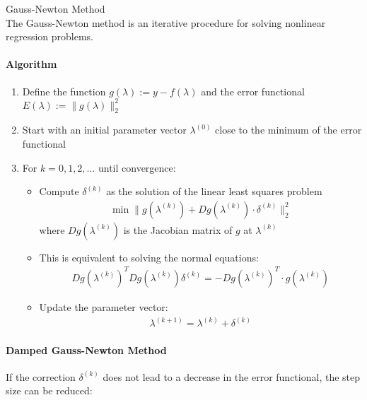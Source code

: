 \begin{KR}{Gauss-Newton Method}\\
The Gauss-Newton method is an iterative procedure for solving nonlinear regression problems.

\paragraph{Algorithm}
\begin{enumerate}
    \item Define the function $g(\lambda) := y - f(\lambda)$ and the error functional $E(\lambda) := \|g(\lambda)\|_2^2$
    \item Start with an initial parameter vector $\lambda^{(0)}$ close to the minimum of the error functional 
    \item For $k = 0, 1, 2, \ldots$ until convergence:
        \begin{itemize}
            \item Compute $\delta^{(k)}$ as the solution of the linear least squares problem
            \begin{align*}
            \min \|g(\lambda^{(k)}) + Dg(\lambda^{(k)}) \cdot \delta^{(k)}\|_2^2
            \end{align*}
            where $Dg(\lambda^{(k)})$ is the Jacobian matrix of $g$ at $\lambda^{(k)}$
            
            \item This is equivalent to solving the normal equations:
            \begin{align*}
            Dg(\lambda^{(k)})^T Dg(\lambda^{(k)})\delta^{(k)} = -Dg(\lambda^{(k)})^T \cdot g(\lambda^{(k)})
            \end{align*}
            
            \item Update the parameter vector:
            \begin{align*}
            \lambda^{(k+1)} = \lambda^{(k)} + \delta^{(k)}
            \end{align*}
        \end{itemize}
\end{enumerate}

\paragraph{Damped Gauss-Newton Method}
If the correction $\delta^{(k)}$ does not lead to a decrease in the error functional, the step size can be reduced:


\end{KR}
